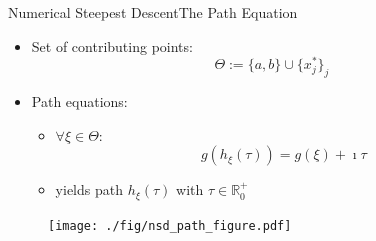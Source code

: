 \documentclass{beamer}
\begin{document}
\begin{frame}{Numerical Steepest Descent}{The Path Equation}
  \begin{minipage}{0.58\linewidth}
    \begin{itemize}
      \item Set of contributing points:
      \begin{equation*}
        \Theta := \{a, b\} \cup \{x^{*}_j\}_j
      \end{equation*}
    \end{itemize}
    \begin{itemize}
      \item Path equations:
      \begin{itemize}
        \item $\forall \xi \in \Theta$:
        \begin{equation*}
          g(h_\xi(\tau)) = g(\xi) + \imath \tau
        \end{equation*}
        \item yields path $h_{\xi}(\tau)$ with $\tau \in \mathbb{R}_0^{+}$
      \end{itemize}
    \end{itemize}
  \end{minipage}
  \begin{minipage}{0.40\linewidth}
    \begin{figure}
      \centering
      \texttt{[image: ./fig/nsd\_path\_figure.pdf]}
    \end{figure}
  \end{minipage}
\end{frame}
\end{document}
